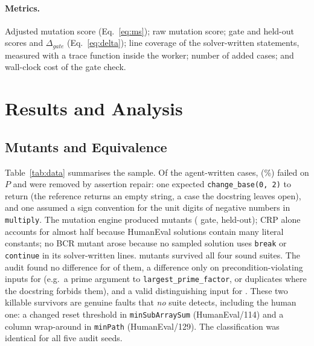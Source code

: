 \documentclass[runningheads]{llncs}
\newcommand{\gate}{\mathit{gate}}
\begin{document}
\paragraph{Metrics.} Adjusted mutation score (Eq.~\ref{eq:ms}); raw mutation score; gate and held-out scores and $\Delta_\gate$ (Eq.~\ref{eq:delta}); line coverage of the solver-written statements, measured with a trace function inside the worker; number of added cases; and wall-clock cost of the gate check.

\section{Results and Analysis}\label{sec:results}

\subsection{Mutants and Equivalence}
Table~\ref{tab:data} summarises the sample. Of the \casesAllRaw{} agent-written cases, \casesDropped{} (\repairRate\%) failed on $P$ and were removed by assertion repair: one expected \texttt{change\_base(0, 2)} to return \texttt{\textquotesingle} (the reference returns an empty string, a case the docstring leaves open), and one assumed a sign convention for the unit digits of negative numbers in \texttt{multiply}. The mutation engine produced \nMut{} mutants (\nGateMut{} gate, \nHeldMut{} held-out); CRP alone accounts for almost half because HumanEval solutions contain many literal constants; no BCR mutant arose because no sampled solution uses \texttt{break} or \texttt{continue} in its solver-written lines. \nSurv{} mutants survived all four sound suites. The audit found no difference for \nEqAudit{} of them, a difference only on precondition-violating inputs for \nEqPre{} (e.g.\ a prime argument to \texttt{largest\_prime\_factor}, or duplicates where the docstring forbids them), and a valid distinguishing input for \nSurvKillable{}. These two killable survivors are genuine faults that \emph{no} suite detects, including the human one: a changed reset threshold in \texttt{minSubArraySum} (HumanEval/114) and a column wrap-around in \texttt{minPath} (HumanEval/129). The classification was identical for all five audit seeds.

\begin{table}[t]
\centering
\caption{Sample, agent cases and mutant statistics.}\label{tab:data}
\scriptsize

\end{table}
\end{document}
